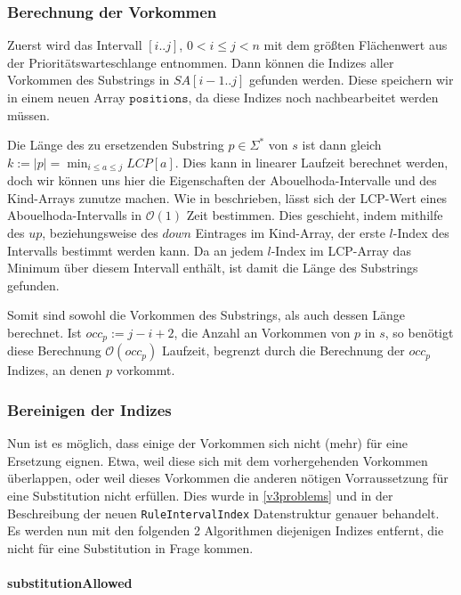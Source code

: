 \subsubsection{Berechnung der Vorkommen}

Zuerst wird das Intervall $[i..j]$, $0 < i \leq j < n$ mit dem größten Flächenwert aus der Prioritätswarteschlange entnommen. Dann können die Indizes aller Vorkommen des Substrings in $SA[i-1..j]$ gefunden werden. Diese speichern wir in einem neuen Array $\texttt{positions}$, da diese Indizes noch nachbearbeitet werden müssen.

Die Länge des zu ersetzenden Substring $p \in \Sigma^*$ von $s$ ist dann gleich $k := |p| = \min_{i \leq a \leq j} LCP[a]$.
Dies kann in linearer Laufzeit berechnet werden, doch wir können uns hier die Eigenschaften der Abouelhoda-Intervalle und des Kind-Arrays zunutze machen. 
Wie in \cite{abouelhoda_optimal_2002} beschrieben, lässt sich der LCP-Wert eines Abouelhoda-Intervalls in $\mathcal{O}(1)$ Zeit bestimmen. Dies geschieht, indem mithilfe des $up$, beziehungsweise des $down$ Eintrages im Kind-Array, der erste $l$-Index des Intervalls bestimmt werden kann. Da an jedem $l$-Index im LCP-Array das Minimum über diesem Intervall enthält, ist damit die Länge des Substrings gefunden.

Somit sind sowohl die Vorkommen des Substrings, als auch dessen Länge berechnet. Ist $occ_p := j - i + 2$, die Anzahl an Vorkommen von $p$ in $s$, so benötigt diese Berechnung $\mathcal{O}(occ_p)$ Laufzeit, begrenzt durch die Berechnung der $occ_p$ Indizes, an denen $p$ vorkommt.

\subsubsection{Bereinigen der Indizes}

Nun ist es möglich, dass einige der Vorkommen sich nicht (mehr) für eine Ersetzung eignen. Etwa, weil diese sich mit dem vorhergehenden Vorkommen überlappen, oder weil dieses Vorkommen die anderen nötigen Vorraussetzung für eine Substitution nicht erfüllen. Dies wurde in \autoref{v3problems} und in der Beschreibung der neuen \texttt{RuleIntervalIndex} Datenstruktur genauer behandelt. Es werden nun mit den folgenden 2 Algorithmen diejenigen Indizes entfernt, die nicht für eine Substitution in Frage kommen.

\paragraph{substitutionAllowed}


